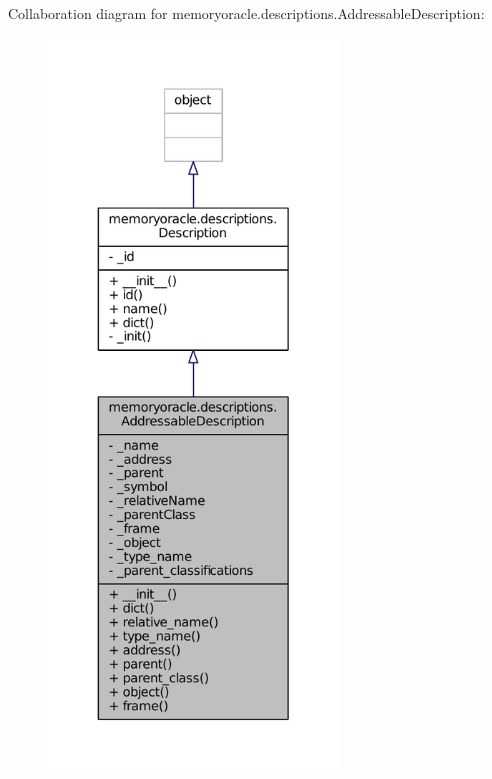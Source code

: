 Collaboration diagram for memoryoracle.\+descriptions.\+Addressable\+Description\+:\nopagebreak
\begin{figure}[H]
\begin{center}
\leavevmode
\includegraphics[height=550pt]{classmemoryoracle_1_1descriptions_1_1AddressableDescription__coll__graph}
\end{center}
\end{figure}
